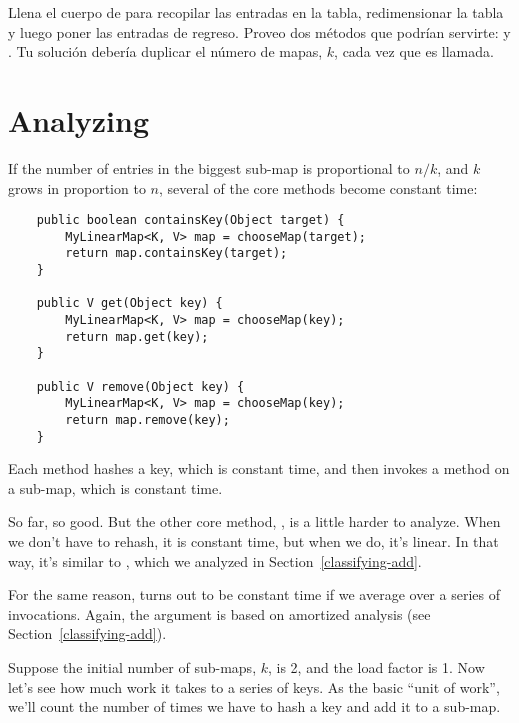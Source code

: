 \documentclass[12pt]{book}
\theoremstyle{exercise}
\begin{document}
Llena el cuerpo de  para recopilar las entradas en la tabla,
redimensionar la tabla y luego poner las entradas de regreso. Proveo dos
métodos que podrían servirte:  y
. Tu solución debería duplicar el número
de mapas, $k$, cada vez que es llamada.


\section{Analyzing }
\label{analyzing-myhashmap}


If the number of entries in the biggest sub-map is proportional to
$n/k$, and $k$ grows in proportion to $n$, several of the core
 methods become constant time:

\begin{verbatim}
    public boolean containsKey(Object target) {
        MyLinearMap<K, V> map = chooseMap(target);
        return map.containsKey(target);
    }

    public V get(Object key) {
        MyLinearMap<K, V> map = chooseMap(key);
        return map.get(key);
    }

    public V remove(Object key) {
        MyLinearMap<K, V> map = chooseMap(key);
        return map.remove(key);
    }
\end{verbatim}

Each method hashes a key, which is constant time, and then invokes a
method on a sub-map, which is constant time.


So far, so good. But the other core method, , is a little
harder to analyze. When we don't have to rehash, it is constant time,
but when we do, it's linear. In that way, it's similar to
, which we analyzed in Section~\ref{classifying-add}.


For the same reason,  turns out to be
constant time if we average over a series of invocations.
Again, the argument is based on amortized analysis 
(see Section~\ref{classifying-add}).


Suppose the initial number of sub-maps, $k$, is 2, and the load
factor is 1. Now let's see how much work it takes to  a
series of keys. As the basic ``unit of work'', we'll count the number of
times we have to hash a key and add it to a sub-map.
\end{document}
